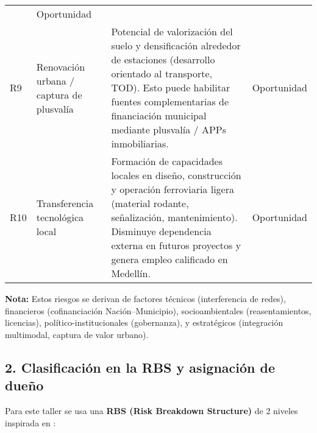 \begin{table}[H]
\begin{tabular}{p{1.2cm}p{3cm}p{8cm}p{2cm}}
& Oportunidad \\
R9  & Renovación urbana / captura de plusvalía & Potencial de valorización del suelo y densificación alrededor de estaciones (desarrollo orientado al transporte, TOD). Esto puede habilitar fuentes complementarias de financiación municipal mediante plusvalía / APPs inmobiliarias. & Oportunidad \\
R10 & Transferencia tecnológica local & Formación de capacidades locales en diseño, construcción y operación ferroviaria ligera (material rodante, señalización, mantenimiento). Disminuye dependencia externa en futuros proyectos y genera empleo calificado en Medellín. & Oportunidad \\
\bottomrule
\end{tabular}
\end{table}

\textbf{Nota:} Estos riesgos se derivan de factores técnicos (interferencia de redes), financieros (cofinanciación Nación--Municipio), socioambientales (reasentamientos, licencias), político-institucionales (gobernanza), y estratégicos (integración multimodal, captura de valor urbano).



\subsection{2. Clasificación en la RBS y asignación de dueño}

Para este taller se usa una \textbf{RBS (Risk Breakdown Structure)} de 2 niveles inspirada en \cite{PMBOK}:

